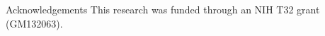 \documentclass[final]{beamer}
\newlength{\onecolwid}
\begin{document}
\begin{frame}[t]
\begin{columns}[t]
\begin{column}{\onecolwid}
\begin{block}{Acknowledgements}
This research was funded through an NIH T32 grant (GM132063).
\end{block}



\end{column} %
\end{columns} %
\end{frame} %
\end{document}
